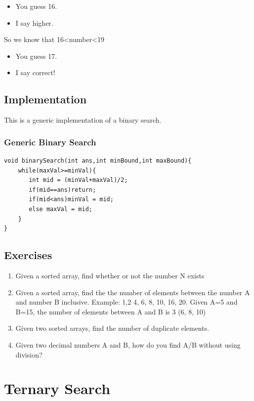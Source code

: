 \documentclass[11pt,oneside]{book}
\begin{document}
\begin{itemize}
\item You guess 16.
\item I say higher.
\end{itemize}

So we know that 16<number<19

\begin{itemize}
\item You guess 17.
\item I say correct!
\end{itemize}

\subsection{Implementation}

This is a generic implementation of a binary search.

\subsubsection{Generic Binary Search}

\begin{lstlisting}
void binarySearch(int ans,int minBound,int maxBound){
    while(maxVal>=minVal){
       int mid = (minVal+maxVal)/2;
       if(mid==ans)return;
       if(mid<ans)minVal = mid;
       else maxVal = mid;
    }
}
\end{lstlisting}

\subsection{Exercises}

\begin{enumerate}
\item Given a sorted array, find whether or not the number N exists
\item Given a sorted array, find the the number of elements between the number A and number B inclusive.
Example: 1,2 4, 6, 8, 10, 16, 20. Given A=5 and B=15, the number of elements between A and B is 3 (6, 8, 10)
\item Given two sorted arrays, find the number of duplicate elements.
\item Given two decimal numbers A and B, how do you find A/B without using division?
\end{enumerate}
\section{Ternary Search}
\end{document}
